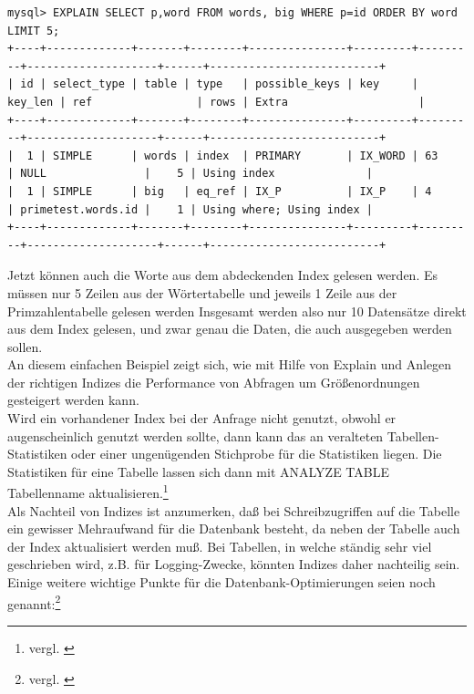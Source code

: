 \begin{lstlisting}[basicstyle=\ttfamily\tiny,caption=Ausführungsplan nach 2. Optimierung]
mysql> EXPLAIN SELECT p,word FROM words, big WHERE p=id ORDER BY word LIMIT 5;
+----+-------------+-------+--------+---------------+---------+---------+--------------------+------+--------------------------+
| id | select_type | table | type   | possible_keys | key     | key_len | ref                | rows | Extra                    |
+----+-------------+-------+--------+---------------+---------+---------+--------------------+------+--------------------------+
|  1 | SIMPLE      | words | index  | PRIMARY       | IX_WORD | 63      | NULL               |    5 | Using index              |
|  1 | SIMPLE      | big   | eq_ref | IX_P          | IX_P    | 4       | primetest.words.id |    1 | Using where; Using index |
+----+-------------+-------+--------+---------------+---------+---------+--------------------+------+--------------------------+
\end{lstlisting}
Jetzt können auch die Worte aus dem abdeckenden Index gelesen werden. Es müssen nur 5 Zeilen aus der Wörtertabelle und jeweils 1 Zeile aus der Primzahlentabelle gelesen werden
Insgesamt werden also nur 10 Datensätze direkt aus dem Index gelesen, und zwar genau die Daten, die auch ausgegeben werden sollen.
\\An diesem einfachen Beispiel zeigt sich, wie mit Hilfe von Explain und Anlegen der richtigen Indizes die Performance von Abfragen um Größenordnungen gesteigert werden kann.
\\Wird ein vorhandener Index bei der Anfrage nicht genutzt, obwohl er augenscheinlich genutzt werden sollte, dann kann das an veralteten Tabellen-Statistiken oder einer ungenügenden Stichprobe für die Statistiken liegen. Die Statistiken für eine Tabelle lassen sich dann mit ANALYZE TABLE Tabellenname aktualisieren.\footnote{vergl. \cite{Erk2008}}
\\Als Nachteil von Indizes ist anzumerken, daß bei Schreibzugriffen auf die Tabelle ein gewisser Mehraufwand für die Datenbank besteht, da neben der Tabelle auch der Index aktualisiert werden muß. Bei Tabellen, in welche ständig sehr viel geschrieben wird, z.B. für Logging-Zwecke, könnten Indizes daher nachteilig sein.
Einige weitere wichtige Punkte für die Datenbank-Optimierungen seien noch genannt:\footnote{vergl. \cite{Galperin2011}}

